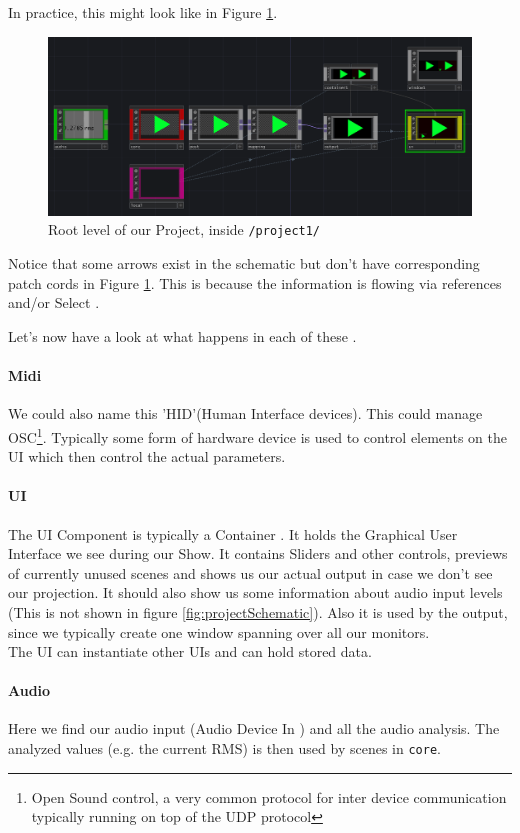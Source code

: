 In practice, this might look like in Figure \ref{fig:structPraxis}.
\begin{figure}[H]
	\centering
	\includegraphics[width=\textwidth]{img/structure1.PNG}
	\caption[shortCaption]
	{Root level of our Project, inside \texttt{/project1/}}
	\label{fig:structPraxis}
\end{figure}

Notice that some arrows exist in the schematic but don't have corresponding patch cords in Figure \ref{fig:structPraxis}. This is because the information is flowing via references and/or Select \OPs.

Let's now have a look at what happens in each of these \COMPs.

\paragraph*{Midi}
We could also name this 'HID'(Human Interface devices). This could manage OSC\footnote{Open Sound control, a very common protocol for inter device communication typically running on top of the UDP protocol}. Typically some form of hardware device is used to control elements on the UI which then control the actual parameters.
\paragraph*{UI}
The UI Component is typically a Container \COMP. It holds the Graphical User Interface we see during our Show. It contains Sliders and other controls, previews of currently unused scenes and shows us our actual output in case we don't see our projection. It should also show us some information about audio input levels (This is not shown in figure \ref{fig:projectSchematic}).
Also it is used by the output, since we typically create one window spanning over all our monitors.\\
The UI can instantiate other UIs and can hold stored data.
\paragraph*{Audio}
Here we find our audio input (Audio Device In \CHOP) and all the audio analysis. The analyzed values (e.g. the current RMS) is then used by scenes in \texttt{core}.
